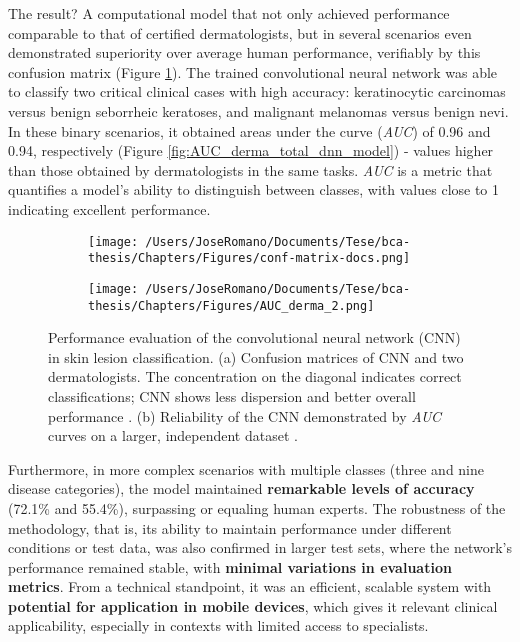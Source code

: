 The result? A computational model that not only achieved performance comparable
to that of certified dermatologists, but in several scenarios even demonstrated
superiority over average human performance, verifiably by this confusion matrix
(Figure \ref{fig:conf-matrix-docs}). The trained convolutional neural network
was able to classify two critical clinical cases with high accuracy:
keratinocytic carcinomas versus benign seborrheic keratoses, and malignant
melanomas versus benign nevi. In these binary scenarios, it obtained areas
under the curve (\textit{AUC}) of 0.96 and 0.94, respectively (Figure
\ref{fig:AUC_derma_total_dnn_model}) - values higher than those obtained by
dermatologists in the same tasks. \textit{AUC} is a metric that quantifies a
model's ability to distinguish between classes, with values close to 1
indicating excellent performance.

\begin{figure}[htbp]
  \centering
  \begin{subfigure}[b]{0.50\textwidth}
    \centering
    \texttt{[image: /Users/JoseRomano/Documents/Tese/bca-thesis/Chapters/Figures/conf-matrix-docs.png]}
    \label{fig:conf-matrix-docs}
  \end{subfigure}
  \hfill
  \begin{subfigure}[b]{0.50\textwidth}
    \centering
    \texttt{[image: /Users/JoseRomano/Documents/Tese/bca-thesis/Chapters/Figures/AUC\_derma\_2.png]}
    \label{fig:AUC_dnn_model}
  \end{subfigure}
  \caption{Performance evaluation of the convolutional neural network (CNN) in skin lesion classification. (a) Confusion matrices of CNN and two dermatologists. The concentration on the diagonal indicates correct classifications; CNN shows less dispersion and better overall performance \cite{ai_in_dermacancer_esteva2017}. (b) Reliability of the CNN demonstrated by \textit{AUC} curves on a larger, independent dataset \cite{ai_in_dermacancer_esteva2017}.}
  \label{fig:AUC_derma_total}
\end{figure}

Furthermore, in more complex scenarios with multiple classes (three and nine
disease categories), the model maintained \textbf{remarkable levels of
  accuracy} (72.1\% and 55.4\%), surpassing or equaling human experts. The
robustness of the methodology, that is, its ability to maintain performance
under different conditions or test data, was also confirmed in larger test
sets, where the network's performance remained stable, with \textbf{minimal
  variations in evaluation metrics}. From a technical standpoint, it was an
efficient, scalable system with \textbf{potential for application in mobile
  devices}, which gives it relevant clinical applicability, especially in
contexts with limited access to specialists.

